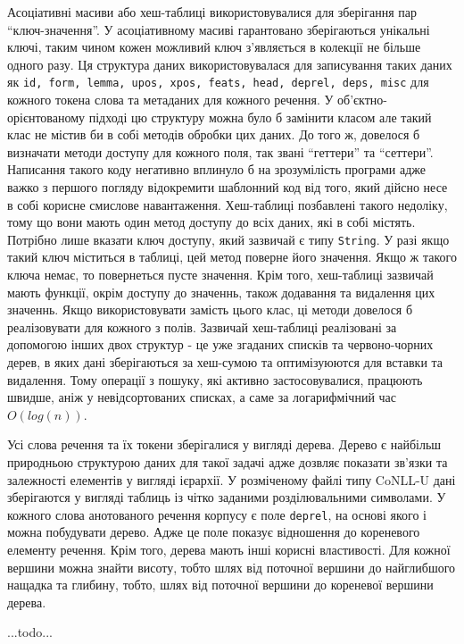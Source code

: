 Асоціативні масиви або хеш-таблиці використовувалися для зберігання пар ``ключ-значення''.
У асоціативному масиві гарантовано зберігаються унікальні ключі, таким чином кожен 
можливий ключ з’являється в колекції не більше одного разу. Ця структура даних
використовувалася для записування таких даних як \texttt{id, form, lemma, upos, xpos,
feats, head, deprel, deps, misc} для кожного токена слова та метаданих для кожного
речення. У об'єктно-орієнтованому підході цю структуру
можна було б замінити класом але такий клас не містив би в собі
методів обробки цих даних. До того ж, довелося б визначати методи доступу для кожного
поля, так звані ``геттери'' та ``сеттери''. Написання такого коду негативно
вплинуло б на зрозумілість програми адже важко з першого погляду відокремити
шаблонний код від того, який дійсно несе в собі корисне смислове навантаження.
Хеш-таблиці позбавлені такого недоліку, тому що вони мають один метод доступу
до всіх даних, які в собі містять. Потрібно лише вказати ключ доступу, який зазвичай
є типу \texttt{String}. У разі якщо такий ключ міститься в таблиці, цей метод поверне
його значення. Якщо ж такого ключа немає, то повернеться пусте значення. Крім того,
хеш-таблиці зазвичай мають функції, окрім доступу до значеннь, також додавання
та видалення цих значеннь. Якщо використовувати замість цього клас, ці методи довелося б
реалізовувати для кожного з полів. Зазвичай хеш-таблиці реалізовані за допомогою
інших двох структур - це уже згаданих списків та червоно-чорних дерев, в яких дані
зберігаються за хеш-сумою та оптимізуюются для вставки та видалення. Тому операції
з пошуку, які активно застосовувалися, працюють швидше, аніж у невідсортованих
списках, а саме за логарифмічний час $O(log(n))$.

Усі слова речення та їх токени зберігалися у вигляді дерева. Дерево є найбільш
природньою структурою даних для такої задачі адже дозвляє показати зв'язки
та залежності елементів у вигляді ієрархії. У розміченому файлі типу CoNLL-U дані зберігаются
у вигляді таблиць із чітко заданими розділювальними символами.
У кожного слова анотованого речення корпусу є поле \texttt{deprel},
на основі якого і можна побудувати дерево. Адже це поле показує відношення до кореневого
елементу речення. Крім того, дерева мають інші корисні властивості. Для кожної вершини
можна знайти висоту, тобто шлях від поточної вершини до найглибшого нащадка та глибину,
тобто, шлях від поточної вершини до кореневої вершини дерева.

\begin{center}
    ...todo...
\end{center}

